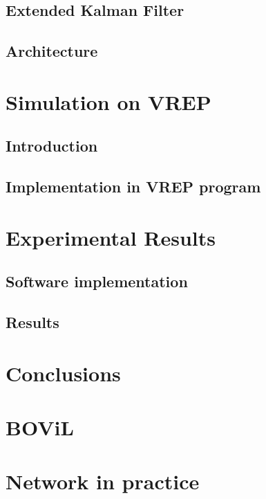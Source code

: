 \documentclass[11pt, oneside]{book} %
\begin{document}
\section{Extended Kalman Filter}


\newpage
\section{Architecture} \label{sec:SoftArch}



\chapter{Simulation on VREP}
\section{Introduction}


\section{Implementation in VREP program}


\chapter{Experimental Results}
\section{Software implementation}


\section{Results}



\chapter{Conclusions} \label{chap:c6_conclusions}


\begin{appendix}
\chapter{BOViL} \label{chap:c6_bovil}


\chapter{Network in practice} \label{chap:c6_network}

\end{appendix}
\end{document}
